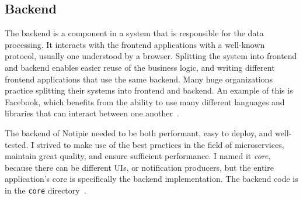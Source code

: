 \subsection{Backend}\label{sec:backend}

The backend is a component in a system
that is responsible for the data processing.
It interacts with the frontend applications
with a well-known protocol,
usually one understood by a browser.
Splitting the system into frontend and backend
enables easier reuse of the business logic,
and writing different frontend applications
that use the same backend.
Many huge organizations practice splitting
their systems into frontend and backend.
An example of this is Facebook,
which benefits from the ability to use
many different languages and libraries
that can interact between one another~\cite{abdullah_frontend_2014}.

The backend of Notipie
needed to be both performant,
easy to deploy,
and well-tested.
I strived to make use of the best practices
in the field of microservices,
maintain great quality,
and ensure sufficient performance.
I named it \textit{core},
because there can be different \acp{UI},
or notification producers,
but the entire application's core
is specifically the backend implementation.
The backend code
is in the
\texttt{core} directory~\cite{sewera_notipie_2022}.




